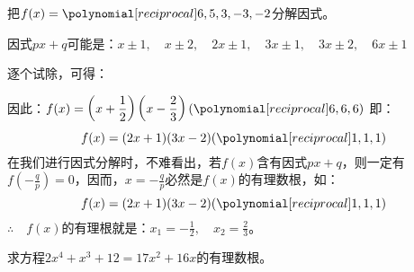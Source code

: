 \begin{example}
把$f(x)=\poly{6,5,3,-3,-2}$分解因式。
\end{example}

\begin{solution}
因式$px+q$可能是：$x\pm 1,\quad x\pm 2,\quad 2x\pm 1,\quad 3x\pm 1,\quad 3x\pm 2,\quad 6x\pm 1$

逐个试除，可得：
\begin{center}
\end{center}

因此：$f(x)=\left(x+\frac{1}{2}\right)\left(x-\frac{2}{3}\right)(\poly{6,6,6})$
即：
\[f(x)=(2x+1)(3x-2)(\poly{1,1,1})\]
在我们进行因式分解时，不难看出，若$f(x)$含有因式$px+q$，则一定有$f\left(-\frac{q}{p}\right)=0$，因而，$x=-\frac{q}{p}$必然是$f(x)$的有理数根，如：
\[f(x)=(2x+1)(3x-2)(\poly{1,1,1})\]
$\therefore\quad f(x)$的有理根就是：$x_1=-\frac{1}{2},\quad x_2=\frac{2}{3}$。
\end{solution}


\begin{example}
    求方程$2x^4+x^3+12=17x^2+16x$的有理数根。
\end{example}

